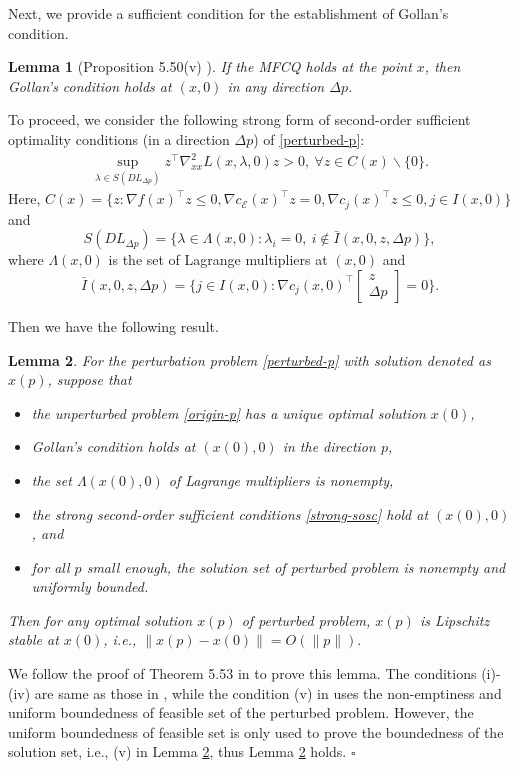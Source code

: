 \documentclass[11pt]{article}
\newenvironment{proof}{{\noindent\it Proof.}\quad}{\hfill $\square$\par}
\newtheorem{lemma}{Lemma}
\begin{document}
Next, we provide a sufficient condition for the establishment of Gollan’s condition. 
\begin{lemma}[Proposition 5.50(v) \cite{bonnans2013perturbation}]\label{lm:gollan}
    If the MFCQ holds at the point \(x\), then Gollan's condition holds at $(x,0)$ in any direction \(\Delta p\).
\end{lemma}

To proceed, we consider the following strong form of second-order sufficient optimality conditions (in a direction \(\Delta p\)) of \eqref{perturbed-p}:
\begin{align}\label{strong-sosc}
\sup_{\lambda \in S(DL_{\Delta p})} z^\top \nabla^2_{xx} L(x,\lambda,0) z > 0,~ \forall z \in C(x) \backslash \{0\}.
\end{align}
Here, \(C(x) = \{z: \nabla f(x)^\top z \leq 0, \nabla c_\mathcal{E}(x)^\top z = 0, \nabla c_j(x)^\top z \leq 0, j \in I(x,0)\}\) and
\[
S(DL_{\Delta p}) = \{\lambda \in \Lambda (x,0) : \lambda_i = 0,~i \notin \bar I(x,0,z,\Delta p)\},
\]
where \(\Lambda (x,0)\) is the set of Lagrange multipliers at \((x,0)\) and 
\[
\bar I(x,0,z,\Delta p) = \{j \in I(x,0): \nabla c_j(x,0)^\top \begin{bmatrix}
            z\\
            \Delta p
        \end{bmatrix}  = 0\}.
\]

Then we have the following result.
\begin{lemma}\label{lm:perturbation}
For the  perturbation problem  \eqref{perturbed-p} with solution denoted as $x(p)$,  suppose that
\begin{itemize}
    \item[(i)] the unperturbed problem \eqref{origin-p} has a unique optimal solution \(x(0)\),
    \item[(ii)] Gollan's condition holds at $(x(0),0)$ in the direction \( p\),
    \item[(iii)] the set \(\Lambda (x(0),0)\) of Lagrange multipliers is nonempty,
    \item[(iv)] the strong second-order sufficient conditions \eqref{strong-sosc} hold at $(x(0),0)$, and 
    \item[(v)] for all \( p \) small enough, the solution set of perturbed problem is nonempty and uniformly bounded.
\end{itemize}
Then for any optimal solution \( x( p) \) of perturbed problem,  \( x(  p) \) is Lipschitz stable at \( x(0) \), i.e., $ \|x(  p) - x(0)\| = O(\|  p\|). $
\end{lemma}
\begin{proof}
    We follow the proof of Theorem 5.53 in \cite{bonnans2013perturbation} to prove this lemma. The conditions (i)-(iv) are  same as those in \cite{bonnans2013perturbation}, while the condition (v) in \cite{bonnans2013perturbation} uses the non-emptiness and uniform boundedness of feasible set of the perturbed problem. However, the uniform boundedness of feasible set is only used to prove the boundedness of the solution set, i.e., (v) in Lemma \ref{lm:perturbation}, thus Lemma \ref{lm:perturbation} holds.
\end{proof}
\end{document}
